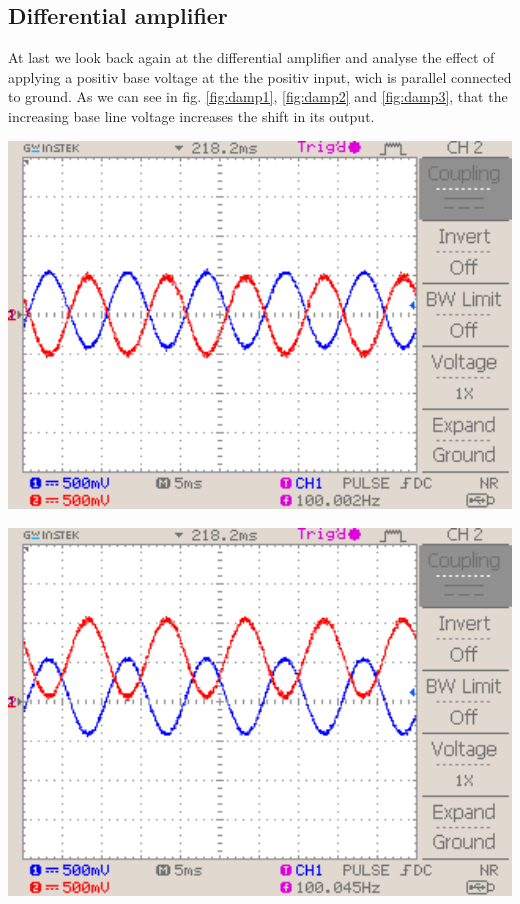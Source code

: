 \documentclass[a4paper,10pt]{article}
\newenvironment{Figure}
        {\par\medskip\noindent\minipage{\linewidth}}
        {\endminipage\par\medskip}
\numberwithin{equation}{section}
\begin{document}
\begin{multicols}{2}
	\subsection{Differential amplifier}
	At last we look back again at the differential amplifier and analyse the effect of applying a positiv base voltage at the the positiv input, wich is parallel connected to ground. As we can see in fig. \ref{fig:damp1}, \ref{fig:damp2} and \ref{fig:damp3}, that the increasing base line voltage increases the shift in its output.
	\begin{Figure}
		\centering
		\includegraphics[width=1\textwidth]{../data/DS0047_n.png}
		\label{fig:damp1}
	\end{Figure}
	\begin{Figure}
		\centering
		\includegraphics[width=1\textwidth]{../data/DS0048_n.png}

\end{Figure}
\end{multicols}
\end{document}
